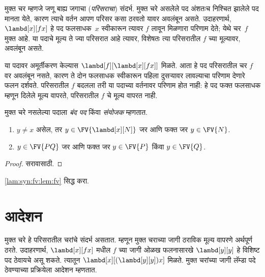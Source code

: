 \begin{explain}
मुक्त चर म्हणजे जणू बाह्य जगाचा (\emph{परिसराचा}) संदर्भ.
मुक्त चरे असलेले पद अंशतःच निश्चित झालेले पद मानता येते,
कारण त्याचे वर्तन आपण परिसर कसा ठरवतो यावर अवलंबून असते.
उदाहरणार्थ, $\lambd[x][f x]$ हे पद फलसाधक~$x$ स्वीकारून
त्यावर $f$ लावून मिळणारा परिणाम देते; येथे चर~$f$ मुक्त आहे.
या पदाचे मूल्य ते ज्या परिसरात आहे त्यावर, विशेषतः त्या
परिसरातील $f$ च्या मूल्यावर, अवलंबून असते.

या पदावर अमूर्तीकरण केल्यास $\lambd[f][\lambd[x][f
    x]]$ मिळते. आता हे पद परिसरातील चर $f$ वर अवलंबून
नसते, कारण ते दोन फलसाधक स्वीकारून पहिला दुसऱ्यावर
लावल्याचा परिणाम देणारे फलन दर्शवते. परिसरातील $f$
बदलला तरी या पदाच्या वर्तनावर परिणाम होत नाही: हे पद
फक्त फलसाधक म्हणून दिलेले मूल्य वापरते, परिसरातील
$f$ चे मूल्य वापरत नाही.
\end{explain}

\begin{defn}[बंद पद, संयोजक]
  मुक्त चरे नसलेल्या पदाला \emph{बंद पद} किंवा
  \emph{संयोजक} म्हणतात.
\end{defn}

\begin{lem}\label{lam:syn:fv:lem:fv}
  \begin{enumerate}
    \item \label{lam:syn:fv:lem:fv-abs} $y \neq x$ असेल, तर $y \in
      \FV{\lambd[x][N]}$ जर आणि फक्त जर $y \in \FV{N}$.
    \item \label{lam:syn:fv:lem:fv-app} $y \in \FV{PQ}$ जर आणि
      फक्त जर $y \in \FV{P}$ किंवा $y
      \in \FV{Q}$.
    \end{enumerate}
\end{lem}

\begin{proof}
  सरावासाठी.
\end{proof}

\begin{prob}
  \ref{lam:syn:fv:lem:fv} सिद्ध करा.
\end{prob}











\section{आदेशन}\label{lam:syn:sub:sec}

\begin{explain}
मुक्त चरे हे परिसरातील चरांचे संदर्भ असतात. म्हणून मुक्त
चराच्या जागी ठराविक मूल्य वापरणे अर्थपूर्ण ठरते. उदाहरणार्थ,
$\lambd[x][f x]$ मधील $f$ च्या जागी ओळख फलनासारखे
$\lambd[y][y]$ हे विशिष्ट पद ठेवायचे असू शकते. त्यातून
$\lambd[x][(\lambd[y][y]) x]$ मिळते. मुक्त चरांच्या जागी
लॅम्डा पदे ठेवण्याच्या प्रक्रियेला आदेशन म्हणतात.
\end{explain}

